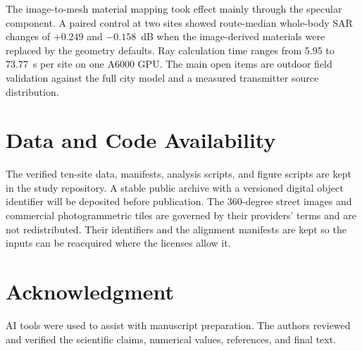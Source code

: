\documentclass{ieeeaccess}
\begin{document}
The image-to-mesh material mapping took effect mainly through the specular
component. A paired control at two sites showed route-median whole-body SAR
changes of $+0.249$ and $-0.158$~dB when the image-derived materials were
replaced by the geometry defaults. Ray calculation time ranges from 5.95 to 73.77~s per site on one A6000 GPU. The main open items are outdoor field validation against the
full city model and a measured transmitter source distribution.

\section*{Data and Code Availability}

The verified ten-site data, manifests, analysis scripts, and figure scripts
are kept in the study repository. A stable public archive with a versioned
digital object identifier will be deposited before publication. The 360-degree
street images and commercial photogrammetric tiles are governed by their
providers' terms and are not redistributed. Their identifiers and the alignment
manifests are kept so the inputs can be reacquired where the licenses allow it.

\section*{Acknowledgment}

AI tools were used to assist with manuscript preparation. The authors reviewed
and verified the scientific claims, numerical values, references, and final
text.
\end{document}
